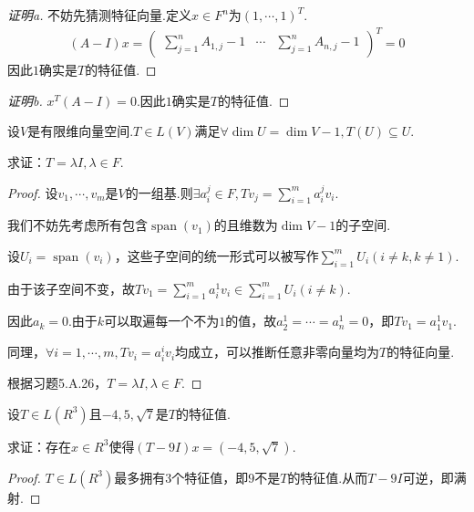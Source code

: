 \begin{proof}[证明a]
    不妨先猜测特征向量.定义\(x \in F^n\)为\((1,\cdots,1)^T\).
    \begin{align*}
        (A-I)x=
            \begin{pmatrix}
                \sum_{j=1}^n A_{1,j}-1 & \cdots & \sum_{j=1}^n A_{n,j}-1
            \end{pmatrix}^T
            =0
    \end{align*}
    因此\(1\)确实是\(T\)的特征值.
\end{proof}

\begin{proof}[证明b]
    \(x^T(A-I)=0\).因此\(1\)确实是\(T\)的特征值.
\end{proof}

\begin{problem}[28]\label{5.A.28}
    设\(V\)是有限维向量空间.\(T \in L(V)\)满足\(\forall \dim U=\dim V-1,T(U) \subseteq U\).
    
    求证：\(T=\lambda I,\lambda \in F\).
\end{problem}

\begin{proof}
    设\(v_1,\cdots,v_m\)是\(V\)的一组基.则\(\exists a_i^j \in F,Tv_j=\sum_{i=1}^m a_i^j v_i\).

    我们不妨先考虑所有包含\(\operatorname{span} (v_1)\)的且维数为\(\dim V-1\)的子空间.
    
    设\(U_i=\operatorname{span} (v_i)\)，这些子空间的统一形式可以被写作\(\sum_{i=1}^m U_i(i \ne k,k \ne 1)\).
    
    由于该子空间不变，故\(Tv_1=\sum_{i=1}^m a_i^1 v_i \in \sum_{i=1}^m U_i(i \ne k)\).
    
    因此\(a_{k}=0\).由于\(k\)可以取遍每一个不为\(1\)的值，故\(a_2^1=\cdots=a_n^1=0\)，即\(Tv_1=a_1^1 v_1\).
    
    同理，\(\forall i=1,\cdots,m,Tv_i=a_i^i v_i\)均成立，可以推断任意非零向量均为\(T\)的特征向量.
    
    根据习题5.A.26，\(T=\lambda I,\lambda \in F\).
\end{proof}

\begin{problem}[30]\label{5.A.30}
    设\(T \in L(R^3)\)且\(-4,5,\sqrt{7}\)是\(T\)的特征值.

    求证：存在\(x \in R^3\)使得\((T-9I)x=(-4,5,\sqrt{7})\).
\end{problem}

\begin{proof}
    \(T \in L(R^3)\)最多拥有\(3\)个特征值，即\(9\)不是\(T\)的特征值.从而\(T-9I\)可逆，即满射.
\end{proof}

